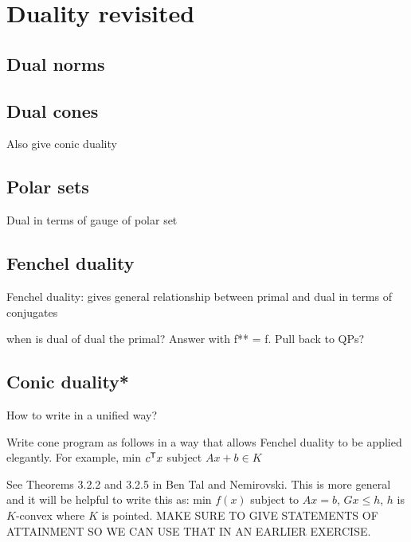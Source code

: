 \chapter{Duality revisited}
\label{chap:duality_revisited}

\section{Dual norms}
\label{sec:dual_norms}

\section{Dual cones}
\label{sec:dual_cones}
Also give conic duality

\section{Polar sets}
\label{sec:polar_sets}

Dual in terms of gauge of polar set 

\section{Fenchel duality}

Fenchel duality: gives general relationship between primal and dual in terms of
conjugates 

when is dual of dual the primal? Answer with f** = f. Pull back to QPs? 

\section{Conic duality*}
\label{sec:conic_duality}

How to write in a unified way?

Write cone program as follows in a way that allows Fenchel duality to be applied
elegantly. For example, min $c^{\mathsf{T}} x$ subject $Ax + b \in K$

See Theorems 3.2.2 and 3.2.5 in Ben Tal and Nemirovski. This is more general and 
it will be helpful to write this as: min $f(x)$ subject to $Ax = b$, $Gx \leq
h$, $h$ is $K$-convex where $K$ is pointed. MAKE SURE TO GIVE STATEMENTS OF
ATTAINMENT SO WE CAN USE THAT IN AN EARLIER EXERCISE. 

